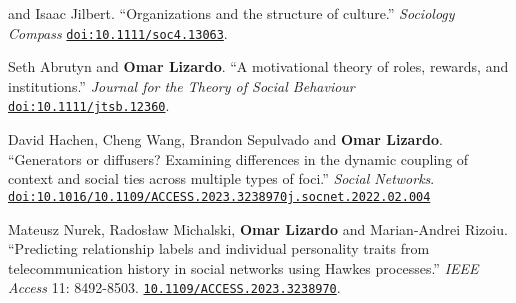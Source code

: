 

 and Isaac Jilbert. ``Organizations and the structure of culture.'' {\em Sociology Compass} \href{https://doi.org/10.1111/soc4.13063}{\nolinkurl{doi:10.1111/soc4.13063}}.

\ind Seth Abrutyn and {\bf Omar Lizardo}. ``A motivational theory of roles, rewards, and institutions.'' {\em Journal for the Theory of Social Behaviour} \href{https://doi.org/10.1111/jtsb.12360}{\nolinkurl{doi:10.1111/jtsb.12360}}.

\ind David Hachen, Cheng Wang, Brandon Sepulvado and {\bf Omar Lizardo}. ``Generators or diffusers? Examining differences in the dynamic coupling of context and social ties across multiple types of foci.'' {\em Social Networks}. \href{https://doi.org/10.1016/j.socnet.2022.02.004}{\nolinkurl{doi:10.1016/10.1109/ACCESS.2023.3238970j.socnet.2022.02.004}}

\ind Mateusz Nurek, Rados\l{}aw Michalski, {\bf Omar Lizardo} and Marian-Andrei Rizoiu. ``Predicting relationship labels and individual personality traits from telecommunication history in social networks using Hawkes processes.'' {\em IEEE Access} 11: 8492-8503. \href{https://doi.org/10.1109/ACCESS.2023.3238970}{\nolinkurl{10.1109/ACCESS.2023.3238970}}.
